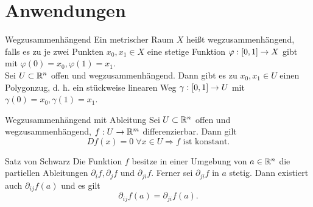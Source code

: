 \documentclass[main.tex]{subfiles}
\begin{document}
\section*{Anwendungen}

\begin{karte}{Wegzusammenhängend}
    Ein metrischer Raum \(X\) heißt wegzusammenhängend, falls 
    es zu je zwei Punkten \( x_0, x_1 \in X \) eine stetige 
    Funktion \( \varphi : [0,1] \rightarrow X \) gibt mit 
    \( \varphi(0) = x_0, \varphi(1) = x_1 \).\\
    Sei \(U \subset \mathbb{R}^n \) offen und wegzusammenhängend. 
    Dann gibt es zu \(x_0, x_1 \in U\) einen Polygonzug, d. h. 
    ein stückweise linearen Weg \(\gamma : [0,1] \rightarrow U\) mit
    \(\gamma(0) = x_0, \gamma(1) = x_1\).
\end{karte}

\begin{karte}{Wegzusammenhängend mit Ableitung}
    Sei \(U \subset \mathbb{R}^n\) offen und wegzusammenhängend,
    \( f : U \rightarrow \mathbb{R}^m \) differenzierbar. Dann gilt
    \[ Df(x) = 0 \; \forall x \in U \Rightarrow f \text{ ist konstant.} \]
\end{karte}

\begin{karte}{Satz von Schwarz}
    Die Funktion \(f\) besitze in einer Umgebung von \(a \in \mathbb{R}^n\) 
    die partiellen Ableitungen \( \partial_i f, \partial_j f \) und 
    \( \partial_{ji} f \). Ferner sei \( \partial_{ji}f \) in \(a\) 
    stetig. Dann existiert auch \( \partial_{ij} f(a) \) und es gilt
    \[ \partial_{ij}f(a) = \partial_{ji} f(a). \]
\end{karte}
\end{document}
